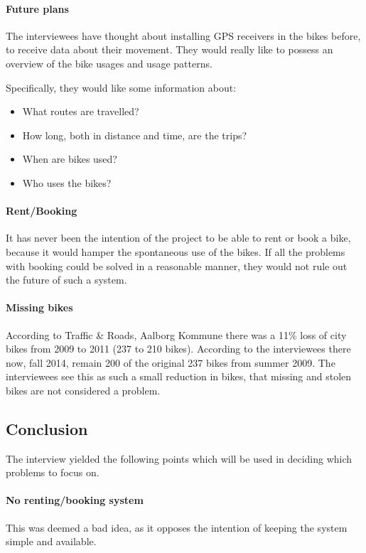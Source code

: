 \paragraph{Future plans}
The interviewees have thought about installing GPS receivers in the bikes before, to receive data about their movement.
They would really like to possess an overview of the bike usages and usage patterns. 

Specifically, they would like some information about:
\begin{itemize}
\item What routes are travelled?
\item How long, both in distance and time, are the trips?
\item When are bikes used?
\item Who uses the bikes?
\end{itemize}

\paragraph{Rent/Booking}
It has never been the intention of the \citybike project to be able to rent or book a bike, because it would hamper the spontaneous use of the bikes.
If all the problems with booking could be solved in a reasonable manner, they would not rule out the future of such a system.

\paragraph{Missing bikes}
According to Traffic \& Roads, Aalborg Kommune\cite{cykelplanlaegning} there was a 11\% loss of city bikes from 2009 to 2011 (237 to 210 bikes).
According to the interviewees there now, fall 2014, remain 200 of the original 237 bikes from summer 2009.
The interviewees see this as such a small reduction in bikes, that missing and stolen bikes are not considered a problem.

\subsection{Conclusion}
The interview yielded the following points which will be used in deciding which problems to focus on.

\paragraph{No renting/booking system}
This was deemed a bad idea, as it opposes the intention of keeping the system simple and available.

